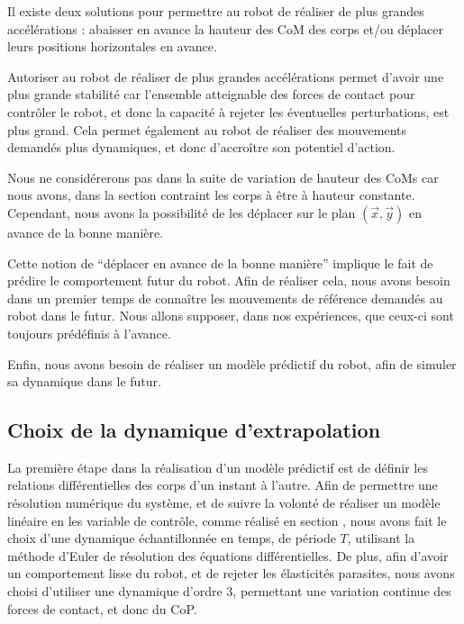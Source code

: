 			Il existe deux solutions pour permettre au robot de réaliser de plus grandes accélérations : 
			abaisser en avance la hauteur des CoM des corps et/ou déplacer leurs positions horizontales en avance. 
			
			Autoriser au robot de réaliser de plus grandes accélérations permet d'avoir une plus grande stabilité car l'ensemble atteignable des forces de contact pour contrôler le robot, et donc la capacité à rejeter les éventuelles perturbations, est plus grand.
			Cela permet également au robot de réaliser des mouvements demandés plus dynamiques, et donc d’accroître son potentiel d'action.
			
			Nous ne considérerons pas dans la suite de variation de hauteur des CoMs car nous avons, dans la section  contraint les corps à être à hauteur constante.
			Cependant, nous avons la possibilité de les déplacer sur le plan $(\vec{x}, \vec{y})$ en avance de la bonne manière.
			
			Cette notion de ``déplacer en avance de la bonne manière'' implique le fait de prédire le comportement futur du robot.
			Afin de réaliser cela, nous avons besoin dans un premier temps de connaître les mouvements de référence demandés au robot dans le futur.
			Nous allons supposer, dans nos expériences, que ceux-ci sont toujours prédéfinis à l'avance.
			
			Enfin, nous avons besoin de réaliser un modèle prédictif du robot, afin de simuler sa dynamique dans le futur.

		\subsection{Choix de la dynamique d'extrapolation}

			La première étape dans la réalisation d'un modèle prédictif est de définir les relations différentielles des corps d'un instant à l'autre.
			Afin de permettre une résolution numérique du système, et de suivre la volonté de réaliser un modèle linéaire en les variable de contrôle, comme réalisé en section , 
			nous avons fait le choix d'une dynamique échantillonnée en temps, de période $T$, utilisant la méthode d'Euler de résolution des équations différentielles.
			De plus, afin d'avoir un comportement lisse du robot, et de rejeter les élasticités parasites, nous avons choisi d'utiliser une dynamique d'ordre 3, permettant une variation continue des forces de contact, et donc du CoP.
			
